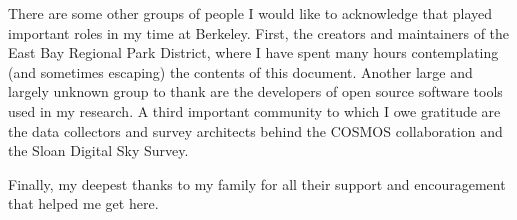 \documentclass[12pt]{myucthesis}
\begin{document}
\begin{frontmatter}
\begin{acknowledgements}
There are some other groups of people I would like to acknowledge that
played important roles in my time at Berkeley. First, the creators and
maintainers of the East Bay Regional Park District, where I have spent
many hours contemplating (and sometimes escaping) the contents of this
document.  Another large and largely unknown group to thank are the
developers of open source software tools used in my research. A third
important community to which I owe gratitude are the data collectors
and survey architects behind the COSMOS collaboration and the Sloan
Digital Sky Survey.

Finally, my deepest thanks to my family for all their support and
encouragement that helped me get here.

\end{acknowledgements}
\end{frontmatter}





%
%
%
{}
\end{document}
